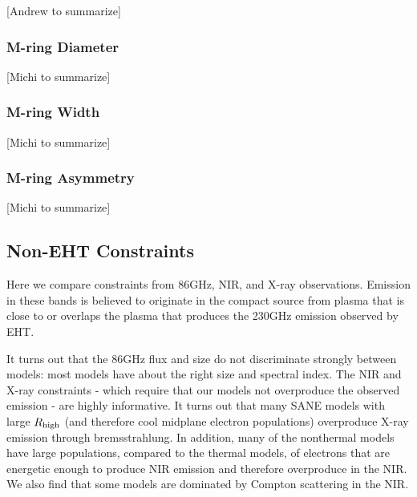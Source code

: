 [Andrew to summarize]

\subsubsection{M-ring Diameter}

[Michi to summarize]

\subsubsection{M-ring Width}

[Michi to summarize]

\subsubsection{M-ring Asymmetry}

[Michi to summarize]

\subsection{Non-EHT Constraints}

Here we compare constraints from 86GHz, NIR, and X-ray observations.  Emission in these bands is believed to originate in the compact source from plasma that is close to or overlaps the plasma that produces the 230GHz emission observed by EHT.

It turns out that the 86GHz flux and size do not discriminate strongly between models: most models have about the right size and spectral index.  The NIR and X-ray constraints - which require that our models not overproduce the observed emission - are highly informative.  It turns out that many SANE models with large ${R_\mathrm{high}}$ (and therefore cool midplane electron populations) overproduce X-ray emission through bremsstrahlung.  In addition, many of the nonthermal models have large populations, compared to the thermal models, of electrons that are energetic enough to produce NIR emission and therefore overproduce in the NIR.   We also find that some models are dominated by Compton scattering in the NIR.

